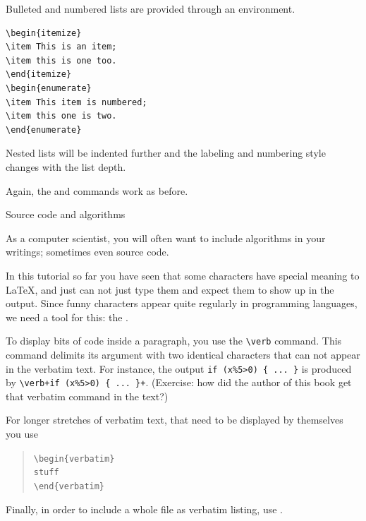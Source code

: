 Bulleted and numbered lists are provided through an environment.
\begin{verbatim}
\begin{itemize}
\item This is an item;
\item this is one too.
\end{itemize}
\begin{enumerate}
\item This item is numbered;
\item this one is two.
\end{enumerate}
\end{verbatim}

{Nested lists will be indented further and the labeling and numbering
  style changes with the list depth.}{}

{Again, the \n{\\label} and \n{\\ref} commands work as before.}{}

 {Source code and algorithms}

As a computer scientist, you will often want to include 
algorithms in your writings; sometimes even source code.

In this tutorial so far you have seen that some characters
have special meaning to \LaTeX{}, and just can not just type them
and expect them to show up in the output. Since funny characters
appear quite regularly in programming languages, we need a tool for this:
the .

To display bits of code inside a paragraph, you use the \verb+\verb+
command.  This command delimits its argument with two identical
characters that can not appear in the verbatim text. For instance,
the output
\verb+if (x%5>0) { ... }+ is produced by \verb/\verb+if (x%5>0) { ... }+/.
(Exercise: how did the author of this book get that verbatim command
in the text?)

For longer stretches of verbatim text, that need to be displayed
by themselves you use
\begin{quote}
\leavevmode\noindent\parindent=0pt
\hbox{\verb+\begin{verbatim}+}\\
\hbox{\verb+stuff+}\\
\hbox{\verb+\end{verbatim}+}
\end{quote}
Finally, in order to include a whole file as verbatim listing, use
\n{}.

